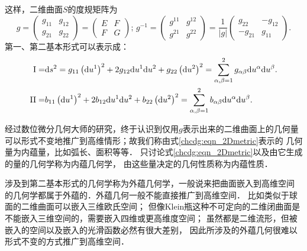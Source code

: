 这样，二维曲面$S$的度规矩阵为
\begin{equation}\label{chcdg:eqn_2Dmetric}     %
    g=\begin{pmatrix} g_{11} & g_{12} \\ g_{21} & g_{22}  \end{pmatrix}
    =\begin{pmatrix} E & F \\ F & G \end{pmatrix} ; \,
    g^{-1}= \begin{pmatrix} g^{11} & g^{12} \\ g^{21} & g^{22}  \end{pmatrix}
    =\frac{1}{|g|}\begin{pmatrix} g_{22} & -g_{12} \\ -g_{21} & g_{11} \end{pmatrix} .
\end{equation} %
第一、第二基本形式可以表示成：
\begin{align}
    {\rm I}=& {\rm d}s^2 = g_{11} \left({\rm d}u^1\right)^2 +2g_{12} {\rm d}u^1{\rm d}u^2
      +g_{22} \left({\rm d}u^2\right)^2= \sum_{\alpha,\beta=1}^{2} g_{\alpha\beta} {\rm d}u^\alpha {\rm d}u^\beta.
       \label{chcdg:eqn_Iform-tensor} \\
    {\rm II}=& b_{11} \left({\rm d}u^1\right)^2 +2b_{12} {\rm d}u^1{\rm d}u^2
      +b_{22} \left({\rm d}u^2\right)^2= \sum_{\alpha,\beta=1}^{2} b_{\alpha\beta} {\rm d}u^\alpha {\rm d}u^\beta.
    \label{chcdg:eqn_IIform-tensor} 
\end{align}

经过数位微分几何大师的研究，终于认识到仅用$g$表示出来的二维曲面上的几何量
可以形式不变地推广到高维情形；故我们称由式\eqref{chcdg:eqn_2Dmetric}表示的
几何量为{\heiti 内蕴量}，比如弧长、面积等等．
只讨论式\eqref{chcdg:eqn_2Dmetric}以及由它生成的量的几何学称为{\heiti 内蕴几何学}，
由这些量决定的几何性质称为{\heiti 内蕴性质}．

涉及到第二基本形式的几何学称为{\heiti 外蕴几何学}，一般说来把曲面嵌入到高维空间
的几何学都属于外蕴的．外蕴几何一般不能直接推广到高维空间．
比如类似于球面的二维曲面可以嵌入三维欧氏空间；
但像Klein瓶这种不可定向的二维闭曲面是不能嵌入三维空间的，需要嵌入四维或更高维度空间；
虽然都是二维流形，但被嵌入的空间以及嵌入的光滑函数必然有很大差别，
因此所涉及的外蕴几何很难以形式不变的方式推广到高维空间．




